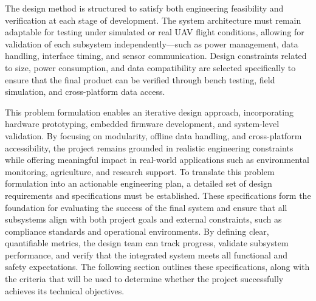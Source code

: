 \documentclass[12pt]{article}
\begin{document}
The design method is structured to satisfy both engineering feasibility and verification at each stage of development. The system architecture must remain adaptable for testing under simulated or real UAV flight conditions, allowing for validation of each subsystem independently—such as power management, data handling, interface timing, and sensor communication. Design constraints related to size, power consumption, and data compatibility are selected specifically to ensure that the final product can be verified through bench testing, field simulation, and cross-platform data access.

This problem formulation enables an iterative design approach, incorporating hardware prototyping, embedded firmware development, and system-level validation. By focusing on modularity, offline data handling, and cross-platform accessibility, the project remains grounded in realistic engineering constraints while offering meaningful impact in real-world applications such as environmental monitoring, agriculture, and research support.
To translate this problem formulation into an actionable engineering plan, a detailed set of design requirements and specifications must be established. These specifications form the foundation for evaluating the success of the final system and ensure that all subsystems align with both project goals and external constraints, such as compliance standards and operational environments. By defining clear, quantifiable metrics, the design team can track progress, validate subsystem performance, and verify that the integrated system meets all functional and safety expectations. The following section outlines these specifications, along with the criteria that will be used to determine whether the project successfully achieves its technical objectives.

\end{document}
